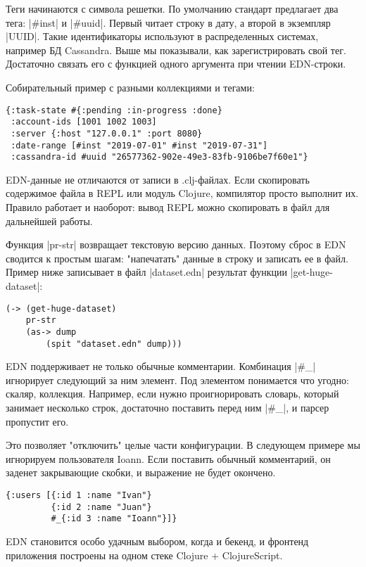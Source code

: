 Теги начинаются с символа решетки. По умолчанию стандарт предлагает два тега:
\spverb|#inst| и \spverb|#uuid|. Первый читает строку в дату, а второй в экземпляр
\spverb|UUID|. Такие идентификаторы используют в распределенных системах, например БД
Cassandra. Выше мы показывали, как зарегистрировать свой тег. Достаточно связать
его с функцией одного аргумента при чтении EDN-строки.

Собирательный пример с разными коллекциями и тегами:

\begin{verbatim}
{:task-state #{:pending :in-progress :done}
 :account-ids [1001 1002 1003]
 :server {:host "127.0.0.1" :port 8080}
 :date-range [#inst "2019-07-01" #inst "2019-07-31"]
 :cassandra-id #uuid "26577362-902e-49e3-83fb-9106be7f60e1"}
\end{verbatim}

EDN-данные не отличаются от записи в .clj-файлах. Если скопировать содержимое
файла в REPL или модуль Clojure, компилятор просто выполнит их. Правило работает
и наоборот: вывод REPL можно скопировать в файл для дальнейшей работы.

Функция \spverb|pr-str| возвращает текстовую версию данных. Поэтому сброс в EDN
сводится к простым шагам: "напечатать" данные в строку и записать ее в
файл. Пример ниже записывает в файл \spverb|dataset.edn| результат функции
\spverb|get-huge-dataset|:

\begin{verbatim}
(-> (get-huge-dataset)
    pr-str
    (as-> dump
        (spit "dataset.edn" dump)))
\end{verbatim}

EDN поддерживает не только обычные комментарии. Комбинация \spverb|#_| игнорирует
следующий за ним элемент. Под элементом понимается что угодно: скаляр,
коллекция. Например, если нужно проигнорировать словарь, который занимает
несколько строк, достаточно поставить перед ним \spverb|#_|, и парсер пропустит
его.

Это позволяет "отключить" целые части конфигурации. В следующем примере мы
игнорируем пользователя Ioann. Если поставить обычный комментарий, он заденет
закрывающие скобки, и выражение не будет окончено.

\begin{verbatim}
{:users [{:id 1 :name "Ivan"}
         {:id 2 :name "Juan"}
         #_{:id 3 :name "Ioann"}]}
\end{verbatim}

EDN становится особо удачным выбором, когда и бекенд, и фронтенд приложения
построены на одном стеке Clojure + ClojureScript.

